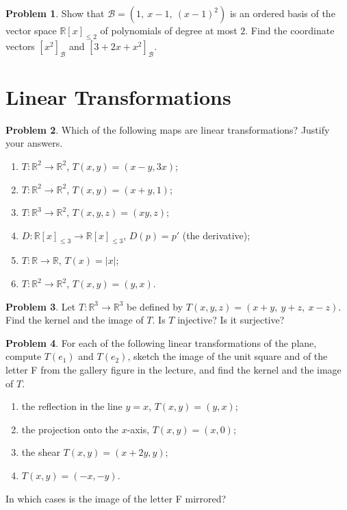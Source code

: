 \documentclass[11pt]{article}
\theoremstyle{definition}
\newtheorem{problem}{Problem}[section]
\begin{document}
\begin{problem}\label{pr:taylor-basis}
    Show that $\mathcal{B} = (1, \ x - 1, \ (x - 1)^2)$ is an ordered basis of the vector space $\mathbb{R}[x]_{\leq 2}$ of polynomials of degree at most $2$. Find the coordinate vectors $[x^2]_{\mathcal{B}}$ and $[3 + 2x + x^2]_{\mathcal{B}}$.
\end{problem}

\section{Linear Transformations}

\begin{problem}\label{pr:linear}
    Which of the following maps are linear transformations? Justify your answers.
    \begin{enumerate}[label=(\alph*)]
        \item $T: \mathbb{R}^2 \to \mathbb{R}^2$, $T(x, y) = (x - y, 3x)$;
        \item $T: \mathbb{R}^2 \to \mathbb{R}^2$, $T(x, y) = (x + y, 1)$;
        \item $T: \mathbb{R}^3 \to \mathbb{R}^2$, $T(x, y, z) = (xy, z)$;
        \item $D: \mathbb{R}[x]_{\leq 3} \to \mathbb{R}[x]_{\leq 3}$, $D(p) = p'$ (the derivative);
        \item $T: \mathbb{R} \to \mathbb{R}$, $T(x) = |x|$;
        \item $T: \mathbb{R}^2 \to \mathbb{R}^2$, $T(x, y) = (y, x)$.
    \end{enumerate}
\end{problem}

\begin{problem}\label{pr:kerim}
    Let $T: \mathbb{R}^3 \to \mathbb{R}^3$ be defined by $T(x, y, z) = (x + y, \ y + z, \ x - z)$. Find the kernel and the image of $T$. Is $T$ injective? Is it surjective?
\end{problem}

\begin{problem}\label{pr:gallery}
    For each of the following linear transformations of the plane, compute $T(e_1)$ and $T(e_2)$, sketch the image of the unit square and of the letter F from the gallery figure in the lecture, and find the kernel and the image of $T$.
    \begin{enumerate}[label=(\alph*)]
        \item the reflection in the line $y = x$, $T(x, y) = (y, x)$;
        \item the projection onto the $x$-axis, $T(x, y) = (x, 0)$;
        \item the shear $T(x, y) = (x + 2y, y)$;
        \item $T(x, y) = (-x, -y)$.
    \end{enumerate}
    In which cases is the image of the letter F mirrored?
\end{problem}
\end{document}
